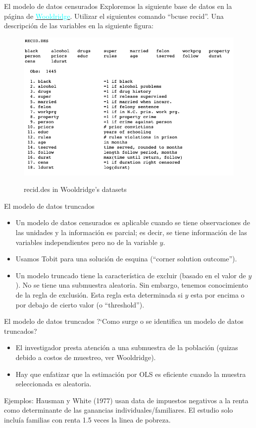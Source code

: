 \begin{frame}{El modelo de datos censurados}
	Exploremos la siguiente base de datos en la página de \href{http://fmwww.bc.edu/ec-p/data/wooldridge/datasets.list.html}{\textcolor{cyan}{Wooldridge}}. Utilizar el siguientes comando ``bcuse recid''. Una descripción de las variables en la siguiente figura:
	\begin{figure}[htbp]
		\hspace*{+1cm} 
		\centering
			\includegraphics[width=0.53\linewidth]{fig/recid} %
		\label{recid}
		\caption{recid.des in Wooldridge's datasets}
	\end{figure} 
\end{frame}
\begin{frame}{El modelo de datos truncados}
	\begin{itemize}
		\item Un modelo de datos censurados es aplicable cuando se tiene observaciones de las unidades y la información es parcial; es decir, se tiene información de las variables independientes pero no de la variable $y$.
		\item Usamos Tobit para una solución de esquina (``corner solution outcome'').
		\item Un modelo truncado tiene la característica de excluir (basado en el valor de $y$ ). No se tiene una submuestra aleatoria. Sin embargo, tenemos conocimiento de la regla de exclusión. Esta regla esta determinada si $y$ esta por encima o por debajo de cierto valor (o ``threshold'').   
	\end{itemize}
\end{frame}
\begin{frame}{El modelo de datos truncados}
	?`Como surge o se identifica un modelo de datos truncados?
		\begin{itemize}
			\item El investigador presta atención a una submuestra de la población (quizas debido a costos de muestreo, ver Wooldridge). 		   
			\item Hay que enfatizar que la estimación por OLS es eficiente cuando la muestra seleccionada es aleatoria.
		\end{itemize}
	Ejemplos: Hausman y White (1977) usan data de impuestos negativos a la renta como determinante  de las ganancias individuales/familiares. El estudio solo incluía familias con renta 1.5 veces la linea de pobreza.
\end{frame}

